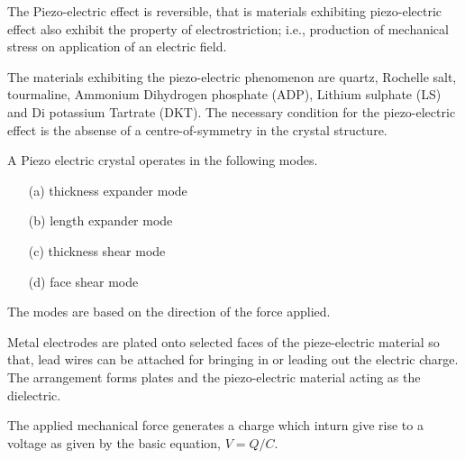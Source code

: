 The Piezo-electric effect is reversible, that is materials exhibiting piezo-electric effect also exhibit the property of electrostriction; i.e., production of mechanical stress on application of an electric field.

\smallskip
The materials exhibiting the piezo-electric phenomenon are quartz, Rochelle salt, tourmaline, Ammonium Dihydrogen phosphate (ADP), Lithium sulphate (LS) and Di potassium Tartrate (DKT). The necessary condition for the piezo-electric effect is the absense of a centre-of-symmetry in the crystal structure.

\smallskip
A Piezo electric crystal operates in the following modes.
\begin{itemize}
\item[(a)] thickness expander mode

\item[(b)] length expander mode

\item[(c)] thickness shear mode

\item[(d)] face shear mode
\end{itemize}
The modes are based on the direction of the force applied.

\smallskip
Metal electrodes are plated onto selected faces of the pieze-electric material so that, lead wires can be attached for bringing in or leading out the electric charge. The arrangement forms plates and the piezo-electric material acting as the dielectric. 

\smallskip
The applied mechanical force generates a charge which inturn give rise to a voltage as given by the basic equation, $V=Q/C$.

